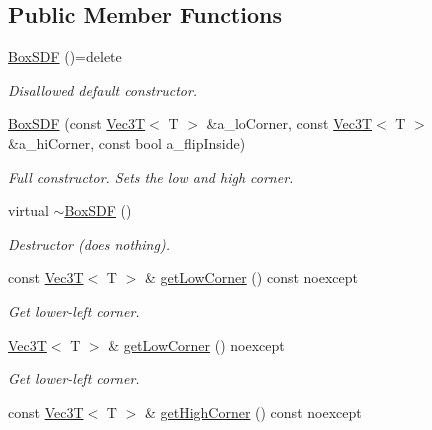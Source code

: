 \subsection*{Public Member Functions}
\begin{DoxyCompactItemize}
\item 
\mbox{\label{classBoxSDF_a59b774b2a6fc27001e1a40662f49c5cb}} 
\hyperlink{classBoxSDF_a59b774b2a6fc27001e1a40662f49c5cb}{Box\+S\+DF} ()=delete
\begin{DoxyCompactList}\small\item\em Disallowed default constructor. \end{DoxyCompactList}\item 
\hyperlink{classBoxSDF_a8cac002be3de6c478a6d68e6e88607d8}{Box\+S\+DF} (const \hyperlink{classVec3T}{Vec3T}$<$ T $>$ \&a\+\_\+lo\+Corner, const \hyperlink{classVec3T}{Vec3T}$<$ T $>$ \&a\+\_\+hi\+Corner, const bool a\+\_\+flip\+Inside)
\begin{DoxyCompactList}\small\item\em Full constructor. Sets the low and high corner. \end{DoxyCompactList}\item 
\mbox{\label{classBoxSDF_aae169f61825b3235cbb44d299c36e268}} 
virtual \hyperlink{classBoxSDF_aae169f61825b3235cbb44d299c36e268}{$\sim$\+Box\+S\+DF} ()
\begin{DoxyCompactList}\small\item\em Destructor (does nothing). \end{DoxyCompactList}\item 
const \hyperlink{classVec3T}{Vec3T}$<$ T $>$ \& \hyperlink{classBoxSDF_a564b5f203d6bec78be94da4b9119748a}{get\+Low\+Corner} () const noexcept
\begin{DoxyCompactList}\small\item\em Get lower-\/left corner. \end{DoxyCompactList}\item 
\hyperlink{classVec3T}{Vec3T}$<$ T $>$ \& \hyperlink{classBoxSDF_aa4ce24307fa921d36527ae4a8d6c0b36}{get\+Low\+Corner} () noexcept
\begin{DoxyCompactList}\small\item\em Get lower-\/left corner. \end{DoxyCompactList}\item 
const \hyperlink{classVec3T}{Vec3T}$<$ T $>$ \& \hyperlink{classBoxSDF_a10f3d6859f29566cca0bf2e89d1142c3}{get\+High\+Corner} () const noexcept

\end{DoxyCompactItemize}
